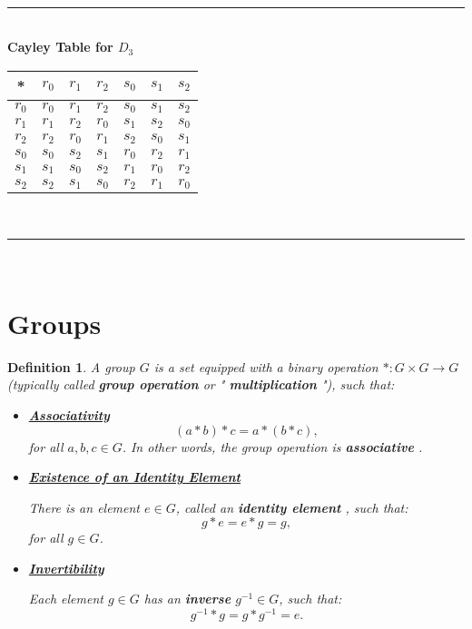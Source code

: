 \documentclass[a4paper,12pt]{report}
\newcommand{\ra}{\longrightarrow}
\newcounter{statement}
\numberwithin{statement}{chapter}
\newtheorem{defn}[statement]{Definition}
\numberwithin{equation}{chapter}
\numberwithin{section}{chapter}
\numberwithin{subsection}{section}
\begin{document}
\quad\\\hrule
\quad\\





\textbf{Cayley Table for $D_3$}



\begin{center}
\begin{tabular}{|c|c|c|c|c|c|c|}
\hline

*
&$r_0$&$r_1$&$r_2$&$s_0$&$s_1$&$s_2$ \\
\hline
$r_0$&$r_0$&$r_1$&$r_2$&$s_0$&$s_1$&$s_2$ \\
\hline
$r_1$&$r_1$&$r_2$&$r_0$&$s_1$&$s_2$&$s_0$ \\
\hline
$r_2$&$r_2$&$r_0$&$r_1$&$s_2$&$s_0$&$s_1$ \\
\hline
$s_0$&$s_0$&$s_2$&$s_1$&$r_0$&$r_2$&$r_1$ \\
\hline
$s_1$&$s_1$&$s_0$&$s_2$&$r_1$&$r_0$&$r_2$ \\
\hline
$s_2$&$s_2$&$s_1$&$s_0$&$r_2$&$r_1$&$r_0$\\\hline
\end{tabular}
\end{center}



\quad\\\hrule
\quad\\
\section*{Groups}

\begin{defn}
A group $G$ is a set equipped with a binary operation $*: G \times G \ra G$ (typically called  {\bf  group operation}  or " {\bf multiplication} "), such that:
\begin{itemize}
\item 
 \underline{  {\bf Associativity} } 
\[(a* b)* c = a * (b * c),\]
for all $a, b, c \in G$. In other words, the group operation is  {\bf associative} .

\item 
 \underline{  {\bf Existence of an Identity Element} } 



There is an element $e \in G$, called an  {\bf identity element} , such that:
\[g* e = e * g = g,\]
for all $g \in G$.

\item 
 \underline{  {\bf Invertibility} } 



Each element $g \in G$ has an  {\bf inverse}  $g^{-1} \in G$, such that:
\[g^{-1}* g = g* g^{-1} = e.\]
\end{itemize}
\end{defn}
\end{document}
